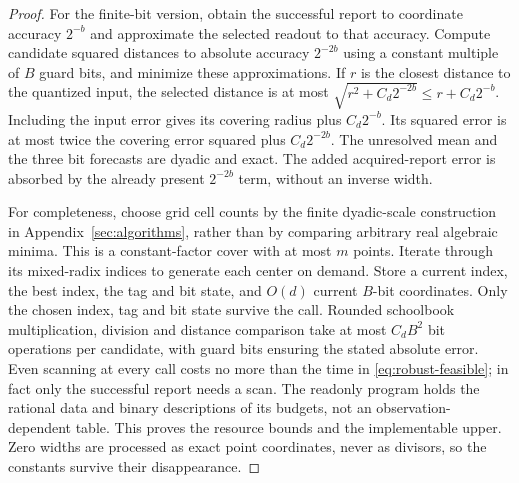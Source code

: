 \begin{proof}
For the finite-bit version, obtain the successful report to coordinate accuracy $2^{-b}$ and approximate the selected readout to that accuracy. Compute candidate squared distances to absolute accuracy $2^{-2b}$ using a constant multiple of $B$ guard bits, and minimize these approximations. If $r$ is the closest distance to the quantized input, the selected distance is at most $\sqrt{r^2+C_d2^{-2b}}\le r+C_d2^{-b}$. Including the input error gives its covering radius plus $C_d2^{-b}$. Its squared error is at most twice the covering error squared plus $C_d2^{-2b}$. The unresolved mean and the three bit forecasts are dyadic and exact. The added acquired-report error is absorbed by the already present $2^{-2b}$ term, without an inverse width.

For completeness, choose grid cell counts by the finite dyadic-scale construction in Appendix~\ref{sec:algorithms}, rather than by comparing arbitrary real algebraic minima. This is a constant-factor cover with at most $m$ points. Iterate through its mixed-radix indices to generate each center on demand. Store a current index, the best index, the tag and bit state, and $O(d)$ current $B$-bit coordinates. Only the chosen index, tag and bit state survive the call. Rounded schoolbook multiplication, division and distance comparison take at most $C_dB^2$ bit operations per candidate, with guard bits ensuring the stated absolute error. Even scanning at every call costs no more than the time in \eqref{eq:robust-feasible}; in fact only the successful report needs a scan. The readonly program holds the rational data and binary descriptions of its budgets, not an observation-dependent table. This proves the resource bounds and the implementable upper. Zero widths are processed as exact point coordinates, never as divisors, so the constants survive their disappearance.
\end{proof}

